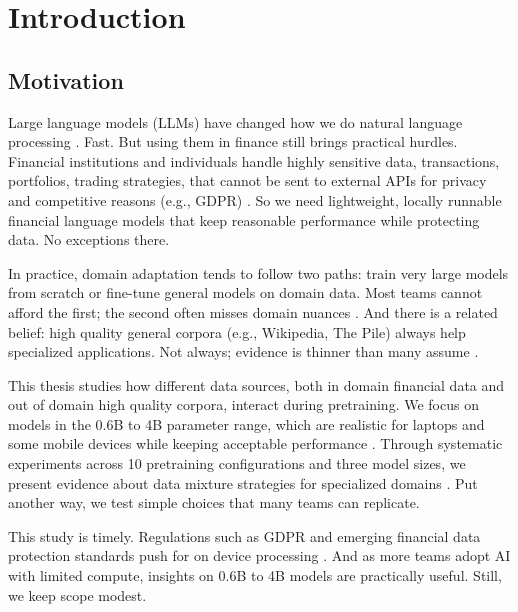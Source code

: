 \chapter{Introduction}

\section{Motivation}

Large language models (LLMs) have changed how we do natural language processing \parencite{vaswani2017attention,radford2019language,brown2020language,touvron2023llama}. Fast. But using them in finance still brings practical hurdles. Financial institutions and individuals handle highly sensitive data, transactions, portfolios, trading strategies, that cannot be sent to external APIs for privacy and competitive reasons (e.g., GDPR) \parencite{eu2016gdpr}. So we need lightweight, locally runnable financial language models that keep reasonable performance while protecting data. No exceptions there.

In practice, domain adaptation tends to follow two paths: train very large models from scratch or fine-tune general models on domain data. Most teams cannot afford the first; the second often misses domain nuances \parencite{gururangan2020don}. And there is a related belief: high quality general corpora (e.g., Wikipedia, The Pile) always help specialized applications. Not always; evidence is thinner than many assume \parencite{gao2020pile,raffel2020exploring,longpre2023pretrainer}.

This thesis studies how different data sources, both in domain financial data and out of domain high quality corpora, interact during pretraining. We focus on models in the 0.6B to 4B parameter range, which are realistic for laptops and some mobile devices while keeping acceptable performance \parencite{yang2024qwen2,xia2023sheared,team2024gemma,javaheripi2023phi}. Through systematic experiments across 10 pretraining configurations and three model sizes, we present evidence about data mixture strategies for specialized domains \parencite{wu2023bloomberggpt}. Put another way, we test simple choices that many teams can replicate.

This study is timely. Regulations such as GDPR and emerging financial data protection standards push for on device processing \parencite{eu2016gdpr}. And as more teams adopt AI with limited compute, insights on 0.6B to 4B models are practically useful. Still, we keep scope modest.

